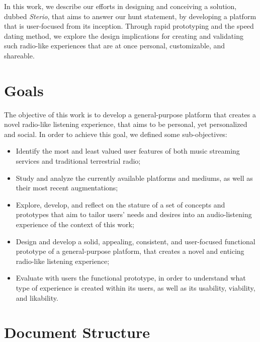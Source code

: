 In this work, we describe our efforts in designing and conceiving a solution, dubbed \textit{Sterio}, that aims to answer our hunt statement, by developing a platform that is user-focused from its inception. Through rapid prototyping and the speed dating method, we explore the design implications for creating and validating such radio-like experiences that are at once personal, customizable, and shareable.

\section{Goals}

The objective of this work is to develop a general-purpose platform that creates a novel radio-like listening experience, that aims to be personal, yet personalized and social. In order to achieve this goal, we defined some sub-objectives:

\begin{itemize}
	\item Identify the most and least valued user features of both music streaming services and traditional terrestrial radio;
	\item Study and analyze the currently available platforms and mediums, as well as their most recent augmentations; 
	\item Explore, develop, and reflect on the stature of a set of concepts and prototypes that aim to tailor users' needs and desires into an audio-listening experience of the context of this work;
	\item Design and develop a solid, appealing, consistent, and user-focused functional prototype of a general-purpose platform, that creates a novel and enticing radio-like listening experience;
	\item Evaluate with users the functional prototype, in order to understand what type of experience is created within its users, as well as its usability, viability, and likability.
\end{itemize}



\section{Document Structure}

